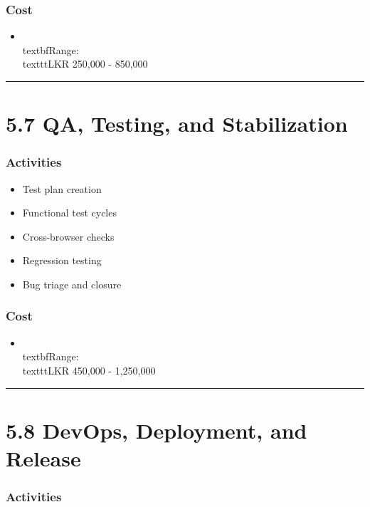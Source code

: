 \documentclass[11pt,a4paper]{article}
\begin{document}
\subsubsection{Cost}

\begin{itemize}
\item \\textbf{Range:} \\texttt{LKR 250,000 - 850,000}
\end{itemize}

\bigskip\hrule\bigskip

\section{5.7 QA, Testing, and Stabilization}

\subsubsection{Activities}

\begin{itemize}
\item Test plan creation
\item Functional test cycles
\item Cross-browser checks
\item Regression testing
\item Bug triage and closure
\end{itemize}

\subsubsection{Cost}

\begin{itemize}
\item \\textbf{Range:} \\texttt{LKR 450,000 - 1,250,000}
\end{itemize}

\bigskip\hrule\bigskip

\section{5.8 DevOps, Deployment, and Release}

\subsubsection{Activities}
\end{document}
